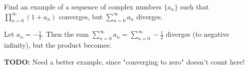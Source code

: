 Find an example of a sequence of complex numbers $\{a_n\}$ such that $\prod\limits_{n=0}^{\infty} (1 + a_n)$ converges, 
but $\sum\limits_{n=0}^{\infty} a_n$ diverges.

\begin{solution}
  Let $a_n = -\frac{1}{2}$. Then the sum $\sum\limits_{n=0}^{\infty} a_n = \sum\limits_{n=0}^{\infty} -\frac{1}{2}$ 
  diverges (to negative infinity), but the product becomes:

  \textbf{TODO: } Need a better example, since "converging to zero" doesn't count here!
  \ \\
\end{solution}
